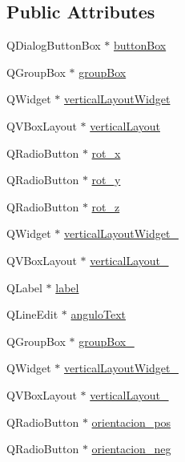 \subsection*{Public Attributes}
\begin{DoxyCompactItemize}
\item 
Q\-Dialog\-Button\-Box $\ast$ \hyperlink{class_ui___rotacional_dialog_a13f390b4593075163c96f55bd7c61343}{button\-Box}
\item 
Q\-Group\-Box $\ast$ \hyperlink{class_ui___rotacional_dialog_a971ceda901e9a6c54eed1131e7f1c5a8}{group\-Box}
\item 
Q\-Widget $\ast$ \hyperlink{class_ui___rotacional_dialog_a060719d4871c77aaecc6d0f2def863f4}{vertical\-Layout\-Widget}
\item 
Q\-V\-Box\-Layout $\ast$ \hyperlink{class_ui___rotacional_dialog_afb0033853ce48ca58337ba41f6219362}{vertical\-Layout}
\item 
Q\-Radio\-Button $\ast$ \hyperlink{class_ui___rotacional_dialog_acd4b87dd99cdfbfb29b609d47d6db760}{rot\-\_\-x}
\item 
Q\-Radio\-Button $\ast$ \hyperlink{class_ui___rotacional_dialog_a8abeb6d13c0abfcccdbbcc0318da1171}{rot\-\_\-y}
\item 
Q\-Radio\-Button $\ast$ \hyperlink{class_ui___rotacional_dialog_a9f6dda774a98edbbe92c81e11af201bb}{rot\-\_\-z}
\item 
Q\-Widget $\ast$ \hyperlink{class_ui___rotacional_dialog_af008c7b04e3b628a96164618c695d0b2}{vertical\-Layout\-Widget\-\_}
\item 
Q\-V\-Box\-Layout $\ast$ \hyperlink{class_ui___rotacional_dialog_ac7dc4cae52d936ecf3e891787a21b9f7}{vertical\-Layout\-\_}
\item 
Q\-Label $\ast$ \hyperlink{class_ui___rotacional_dialog_ab9b180cb438ab783bd292420604d4d5c}{label}
\item 
Q\-Line\-Edit $\ast$ \hyperlink{class_ui___rotacional_dialog_a834fe25a665d4a99446e1fc9a28c8a14}{angulo\-Text}
\item 
Q\-Group\-Box $\ast$ \hyperlink{class_ui___rotacional_dialog_ae84f45d3417cced094876f1cdc486978}{group\-Box\-\_}
\item 
Q\-Widget $\ast$ \hyperlink{class_ui___rotacional_dialog_ade317e77d8449231a328936d44adaefb}{vertical\-Layout\-Widget\-\_}
\item 
Q\-V\-Box\-Layout $\ast$ \hyperlink{class_ui___rotacional_dialog_a5ce0e1ea47c7c8ffdc88e543807ec75c}{vertical\-Layout\-\_}
\item 
Q\-Radio\-Button $\ast$ \hyperlink{class_ui___rotacional_dialog_a6c77910a452af28cca06529c1b760933}{orientacion\-\_\-pos}
\item 
Q\-Radio\-Button $\ast$ \hyperlink{class_ui___rotacional_dialog_a79000d83fecbf9cac33bd66c943a4625}{orientacion\-\_\-neg}
\end{DoxyCompactItemize}


